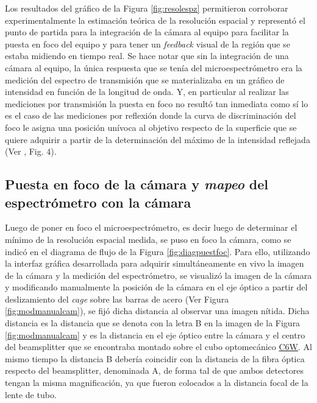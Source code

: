 Los resultados del gráfico de la Figura \ref{fig:resolespz} permitieron corroborar experimentalmente la estimación teórica de la resolución espacial y representó el punto de partida para la integración de la cámara al equipo para facilitar la puesta en foco del equipo y para tener un \textit{feedback} visual de la región que se estaba midiendo en tiempo real. Se hace notar que sin la integración de una cámara al equipo, la única respuesta que se tenía del microespectrómetro era la medición del espectro de transmisión que se materializaba en un gráfico de intensidad en función de la longitud de onda. Y, en particular al realizar las mediciones por transmisión la puesta en foco no resultó tan inmediata como sí lo es el caso de las mediciones por reflexión donde la curva de discriminación del foco le asigna una posición unívoca al objetivo respecto de la superficie que se quiere adquirir a partir de la determinación del máximo de la intensidad reflejada (Ver \cite{mour}, Fig. 4). 

\singlespacing
\subsection{Puesta en foco de la cámara y \textit{mapeo} del espectrómetro con la cámara}
\label{sec:fococam}

\hspace{0.5cm}Luego de poner en foco el microespectrómetro, es decir luego de determinar el mínimo de la resolución espacial medida, se puso en foco la cámara, como se indicó en el diagrama de flujo de la Figura \ref{fig:diagpuestfoc}. Para ello, utilizando la interfaz gráfica desarrollada para adquirir simultáneamente en vivo la imagen de la cámara y la medición del espectrómetro, se visualizó la imagen de la cámara y modificando manualmente la posición de la cámara en el eje óptico a partir del deslizamiento del \textit{cage} sobre las barras de acero (Ver Figura \ref{fig:modmanualcam}), se fijó dicha distancia al observar una imagen nítida. Dicha distancia es la distancia que se denota con la letra B en la imagen de  la Figura \ref{fig:modmanualcam} y es la distancia en el eje óptico entre la cámara y el centro del beamsplitter que se encontraba montado sobre el cubo optomecánico \href{https://www.thorlabs.com/thorproduct.cfm?partnumber=C6W}{C6W}. Al mismo tiempo la distancia B debería coincidir con la distancia de la fibra óptica respecto del beamsplitter, denominada A, de forma tal de que ambos detectores tengan la misma magnificación, ya que fueron colocados a la distancia focal de la lente de tubo.  

